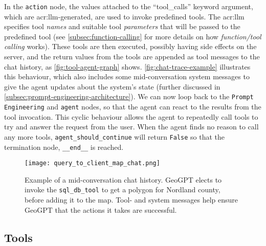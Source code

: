In the \texttt{action} node, the values attached to the \enquote{tool\_calls} keyword argument, which are \acrshort{acr:llm}-generated, are used to invoke predefined tools. The \acrshort{acr:llm} specifies tool \textit{names} and suitable tool \textit{parameters} that will be passed to the predefined tool (see \autoref{subsec:function-calling} for more details on how \textit{function/tool calling} works). These tools are then executed, possibly having side effects on the server, and the return values from the tools are appended as tool messages to the chat history, as \autoref{fig:tool-agent-graph} shows. \autoref{fig:chat-trace-example} illustrates this behaviour, which also includes some mid-conversation system messages to give the agent updates about the system's state (further discussed in \autoref{subsec:prompt-engineering-architecture}). We can now loop back to the \texttt{Prompt Engineering} and \texttt{agent} nodes, so that the agent can react to the results from the tool invocation. This cyclic behaviour allows the agent to repeatedly call tools to try and answer the request from the user. When the agent finds no reason to call any more tools, \texttt{agent\_should\_continue} will return \texttt{False} so that the termination node, \texttt{\_\_end\_\_} is reached.

\begin{figure}
    \centering
    \texttt{[image: query\_to\_client\_map\_chat.png]}
    \caption[Example of a chat history]{Example of a mid-conversation chat history. GeoGPT elects to invoke the \texttt{sql\_db\_tool} to get a polygon for Nordland county, before adding it to the map. Tool- and system messages help ensure GeoGPT that the actions it takes are successful.}
    \label{fig:chat-trace-example}
\end{figure}


\subsection{Tools}
\label{subsec:tools}


